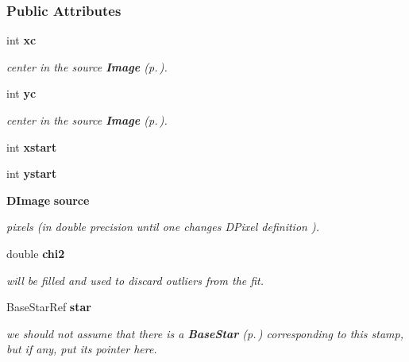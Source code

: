 \subsubsection*{Public Attributes}
\begin{CompactItemize}
\item 
{}
int {\bf xc}\label{class_stamp_m0}

\begin{CompactList}\small\item\em center in the source {\bf Image} {\rm (p.\,\pageref{class_image})}.\item\end{CompactList}\item 
{}
int {\bf yc}\label{class_stamp_m1}

\begin{CompactList}\small\item\em center in the source {\bf Image} {\rm (p.\,\pageref{class_image})}.\item\end{CompactList}\item 
{}
int {\bf xstart}\label{class_stamp_m2}

\item 
{}
int {\bf ystart}\label{class_stamp_m3}

\item 
{}
{\bf DImage} {\bf source}\label{class_stamp_m4}

\begin{CompactList}\small\item\em pixels (in double precision until one changes DPixel definition ).\item\end{CompactList}\item 
{}
double {\bf chi2}\label{class_stamp_m5}

\begin{CompactList}\small\item\em will be filled and used to discard outliers from the fit.\item\end{CompactList}\item 
{}
Base\-Star\-Ref {\bf star}\label{class_stamp_m6}

\begin{CompactList}\small\item\em we should not assume that there is a {\bf Base\-Star} {\rm (p.\,\pageref{class_basestar})} corresponding to this stamp, but if any, put its pointer here.\item\end{CompactList}\end{CompactItemize}


